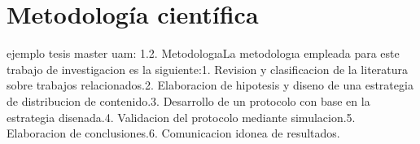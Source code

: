 \section {Metodología científica}

ejemplo tesis master uam:
1.2. MetodologıaLa metodologıa empleada para este trabajo de investigacion es la siguiente:1. Revision y clasificacion de la literatura sobre trabajos relacionados.2. Elaboracion de hipotesis y diseno de una estrategia de distribucion de contenido.3. Desarrollo de un protocolo con base en la estrategia disenada.4. Validacion del protocolo mediante simulacion.5. Elaboracion de conclusiones.6. Comunicacion idonea de resultados.